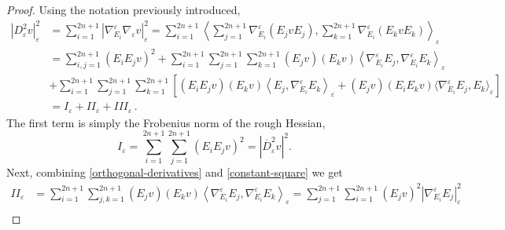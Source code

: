 \documentclass[10pt]{amsart}
\numberwithin{equation}{section}
\theoremstyle{definition}
\newcommand{\eps}{\varepsilon}
\newcommand{\egrad}{\nabla_{\eps}}
\begin{document}
\begin{proof}
	Using the notation previously introduced,
	\begin{equation}\label{eq:splitting_Hessian} 
		\begin{aligned}
			| D^2_\varepsilon v|_\varepsilon^2&=\sum_{i=1}^{2n+1} |\nabla^\varepsilon_{E_i} \nabla_\varepsilon v|_\varepsilon^2= \sum_{i=1}^{2n+1} \left\langle \sum_{j=1}^{2n+1}  \nabla^\varepsilon_{E_i} \left( E_jv E_j  \right),  \sum_{k=1}^{2n+1}  \nabla^\varepsilon_{E_i} \left( E_kv E_k  \right)  \right\rangle_\varepsilon \\
			&=\sum_{i,j=1}^{2n+1} (E_i E_j v)^2+\sum_{i=1}^{2n+1} \sum_{j=1}^{2n+1} \sum_{k=1}^{2n+1} (E_j v)(E_kv)   \left\langle \nabla^\varepsilon_{E_i} E_j, \nabla^\varepsilon_{E_i} E_k \right\rangle_\varepsilon \\
			&+ \sum_{i=1}^{2n+1} \sum_{j=1}^{2n+1} \sum_{k=1}^{2n+1} \left[ (E_i E_j v)(E_kv) \left\langle   E_j, \nabla^\varepsilon_{E_i} E_k \right\rangle_\varepsilon  +(E_j v) (E_iE_kv) \langle \nabla^\varepsilon_{E_i} E_j ,  E_k \rangle_\varepsilon \right]\\
			&=I_\varepsilon+II_\varepsilon+III_\varepsilon \, .
		\end{aligned}
	\end{equation}
	The first term is simply the Frobenius norm of the rough Hessian,
	\begin{equation}
		\label{rough-hessian}
		I_\varepsilon=\sum_{i=1}^{2n+1} \sum_{j=1}^{2n+1}(E_i E_j v)^2 = |\overline{D}_{\varepsilon}^{2}v|^{2}.
	\end{equation}
	Next, combining \eqref{orthogonal-derivatives} and \eqref{constant-square} we get
	\begin{equation}\label{extra-square}
		\begin{aligned}
			II_\varepsilon&= \sum_{i=1}^{2n+1} \sum_{j,k=1}^{2n+1}  (E_j v)(E_kv)   \left\langle \nabla^\varepsilon_{E_i} E_j, \nabla^\varepsilon_{E_i} E_k \right\rangle_\varepsilon = \sum_{j=1}^{2n+1} \sum_{i=1}^{2n+1}  (E_j v)^2   \left| \nabla^\varepsilon_{E_i} E_j \right|_\varepsilon^2\\

\end{aligned}
\end{equation}
\end{proof}
\end{document}
